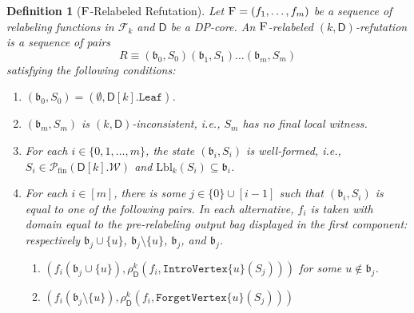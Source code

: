 \documentclass[11pt,a4paper]{article}
\newtheorem{definition}[theorem]{Definition}
\newcommand{\treewidthvalue}{k}
\newcommand{\abag}{\mathfrak{b}}
\newcommand{\introvertextype}[1]{\mathtt{IntroVertex}\{#1\}}
\newcommand{\forgetvertextype}[1]{\mathtt{ForgetVertex}\{#1\}}
\newcommand{\initialsetgeneric}{\mathtt{Leaf}}
\newcommand{\vertexone}{u}
\newcommand{\allwitnesses}{\mathcal{W}}
\newcommand{\finitepowerset}[1]{\mathcal{P}_{\mathrm{fin}}(#1)}
\newcommand{\dpcore}{\mathsf{D}}
\newcommand{\witnessset}{S}
\newcommand{\dprefutation}{R}
\newcommand{\relabelingfunction}{f}
\newcommand{\relabelclass}{\mathcal{F}}
\newcommand{\action}{\rho}
\newcommand{\relabelsequence}{\textsc{F}}
\begin{document}
\begin{definition}[$\relabelsequence$-Relabeled Refutation]\label{definition:RelabeledRefutation}
Let $\relabelsequence = (\relabelingfunction_1,\dots,\relabelingfunction_m)$ be a sequence of relabeling functions in $\relabelclass_\treewidthvalue$ and $\dpcore$ be a DP-core. An $\relabelsequence$-relabeled $(\treewidthvalue,\dpcore)$-refutation is a sequence of pairs
$$\dprefutation \equiv (\abag_0,\witnessset_0)(\abag_1,\witnessset_1)\dots (\abag_m,\witnessset_m)$$ satisfying the following conditions:
\begin{enumerate}
\setlength\itemsep{0.5em}
\item \label{sequence-relabeling-condition-one}
$(\abag_0,\witnessset_0) = (\emptyset,\dpcore[\treewidthvalue].\initialsetgeneric)$.
\item \label{sequence-relabeling-condition-two}
$(\abag_m,\witnessset_m)$ is $(\treewidthvalue,\dpcore)$-inconsistent, i.e., $\witnessset_m$ has no final local witness.
	\item \label{sequence-relabeling-condition-wellformed}
	For each $i\in\{0,1,\dots,m\}$, the state $(\abag_i,\witnessset_i)$ is well-formed, i.e., $\witnessset_i\in \finitepowerset{\dpcore[\treewidthvalue].\allwitnesses}$ and $\mathrm{Lbl}_{\treewidthvalue}(\witnessset_i)\subseteq \abag_i$.
					\item \label{sequence-relabeling-condition-three}
					For each $i\in [m]$, there is some $j\in \{0\}\cup[i-1]$ such that $(\abag_i,\witnessset_i)$ is equal to one of the following pairs.
					In each alternative, $\relabelingfunction_i$ is taken with domain equal to the pre-relabeling output bag displayed in the first component: respectively $\abag_j\cup\{\vertexone\}$, $\abag_j\setminus\{\vertexone\}$, $\abag_j$, and $\abag_j$.
				\begin{enumerate}
	\item \label{sequence-relabeling-IntroVertex}
	$(\relabelingfunction_i(\abag_j\cup \{\vertexone\}), \action_{\dpcore}^{\treewidthvalue}(\relabelingfunction_i,\introvertextype{\vertexone}(\witnessset_j)))$
for some $\vertexone\notin \abag_j$.
\item \label{sequence-relabeling-ForgetVertex}
$(\relabelingfunction_i(\abag_j\setminus \{\vertexone\}), \action_{\dpcore}^{\treewidthvalue}(\relabelingfunction_i,\forgetvertextype{\vertexone}(\witnessset_j)))$

\end{enumerate}
\end{enumerate}
\end{definition}
\end{document}
